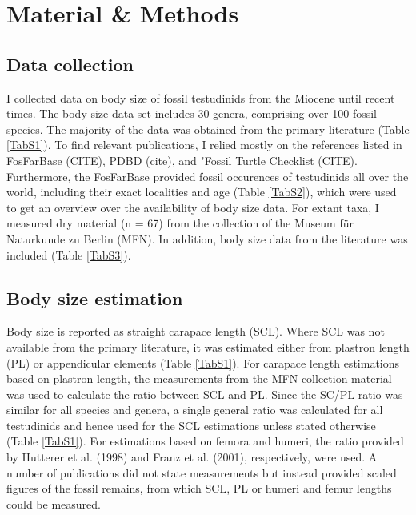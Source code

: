 \section{Material \& Methods}

\subsection{Data collection}
I collected data on body size of fossil testudinids from the Miocene until recent times. The body size data set includes 30 genera, comprising over 100 fossil species. The majority of the data was obtained from the primary literature (Table \ref{TabS1}). To find relevant publications, I relied mostly on the references listed in FosFarBase (CITE), PDBD (cite), and "Fossil Turtle Checklist (CITE).
Furthermore, the FosFarBase provided fossil occurences of testudinids all over the world, including their exact localities and age (Table \ref{TabS2}), which were used to get an overview over the availability of body size data. 
For extant taxa, I measured dry material (n = 67) from the collection of the Museum für Naturkunde zu Berlin (MFN). In addition, body size data from the literature was included (Table \ref{TabS3}).

\subsection{Body size estimation}
Body size is reported as straight carapace length (SCL). Where SCL was not available from the primary literature, it was estimated either from plastron length (PL) or appendicular elements (Table \ref{TabS1}). For carapace length estimations based on plastron length, the measurements from the MFN collection material was used to calculate the ratio between SCL and PL. Since the SC/PL ratio was similar for all species and genera, a single general ratio was calculated for all testudinids and hence used for the SCL estimations unless stated otherwise (Table \ref{TabS1}). For estimations based on femora and humeri, the ratio provided by Hutterer et al. (1998) and Franz et al. (2001), respectively, were used. A number of publications did not state measurements but instead provided scaled figures of the fossil remains, from which SCL, PL or humeri and femur lengths could be measured.


